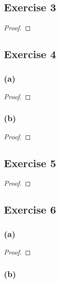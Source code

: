 \documentclass[14pt]{extarticle}
\begin{document}
\subsection{Exercise 3}

\begin{proof}

\end{proof}

\subsection{Exercise 4}

\subsubsection{(a)}

\begin{proof}

\end{proof}

\subsubsection{(b)}

\begin{proof}

\end{proof}

\subsection{Exercise 5}

\begin{proof}

\end{proof}

\subsection{Exercise 6}

\subsubsection{(a)}

\begin{proof}

\end{proof}

\subsubsection{(b)}
\end{document}
